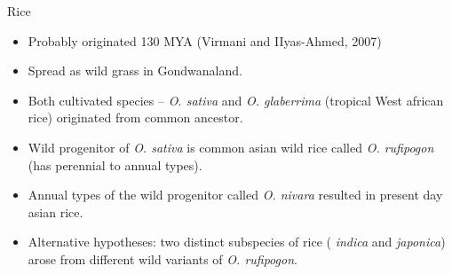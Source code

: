 \documentclass[
  ignorenonframetext,
  aspectratio=169]{beamer}
\providecommand{\tightlist}{%
  \setlength{\itemsep}{0pt}\setlength{\parskip}{0pt}}
\begin{document}
\begin{frame}{Rice}
\protect\hypertarget{rice}{}
\begin{itemize}
\tightlist
\item
  Probably originated 130 MYA (Virmani and IIyas-Ahmed, 2007)
\item
  Spread as wild grass in Gondwanaland.
\item
  Both cultivated species -- \emph{O. sativa} and \emph{O. glaberrima}
  (tropical West african rice) originated from common ancestor.
\item
  Wild progenitor of \emph{O. sativa} is common asian wild rice called
  \emph{O. rufipogon} (has perennial to annual types).
\item
  Annual types of the wild progenitor called \emph{O. nivara} resulted
  in present day asian rice.
\item
  Alternative hypotheses: two distinct subspecies of rice (
  \emph{indica} and \emph{japonica}) arose from different wild variants
  of \emph{O. rufipogon}.
\end{itemize}
\end{frame}
\end{document}
